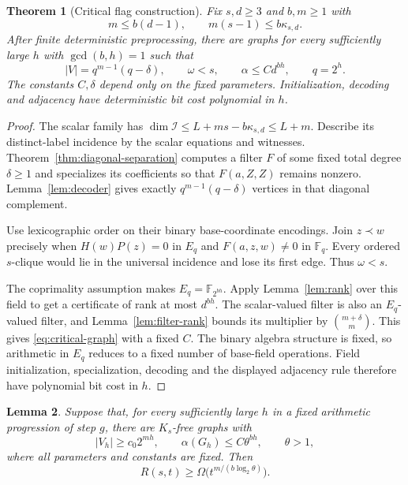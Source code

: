 \documentclass[11pt,a4paper]{article}
\newcommand{\F}{\mathbb F}
\newcommand{\Ical}{\mathcal I}
\newtheorem{theorem}{Theorem}[section]
\newtheorem{lemma}[theorem]{Lemma}
\theoremstyle{definition}
\theoremstyle{remark}
\numberwithin{equation}{section}
\begin{document}
\begin{theorem}[Critical flag construction]\label{thm:critical}
Fix $s,d\ge3$ and $b,m\ge1$ with
\begin{equation}\label{eq:endpoint-condition}
m\le b(d-1),\qquad m(s-1)\le b\kappa_{s,d}.
\end{equation}
After finite deterministic preprocessing, there are graphs for every sufficiently large $h$ with $\gcd(b,h)=1$ such that
\begin{equation}\label{eq:critical-graph}
|V|=q^{m-1}(q-\delta),\qquad\omega<s,\qquad\alpha\le C d^{bh},\qquad q=2^h.
\end{equation}
The constants $C,\delta$ depend only on the fixed parameters. Initialization, decoding and adjacency have deterministic bit cost polynomial in $h$.
\end{theorem}


\begin{proof}
The scalar family has $\dim\Ical\le L+ms-b\kappa_{s,d}\le L+m$. Describe its distinct-label incidence by the scalar equations and witnesses. Theorem~\ref{thm:diagonal-separation} computes a filter $F$ of some fixed total degree $\delta\ge1$ and specializes its coefficients so that $F(a,Z,Z)$ remains nonzero. Lemma~\ref{lem:decoder} gives exactly $q^{m-1}(q-\delta)$ vertices in that diagonal complement.

Use lexicographic order on their binary base-coordinate encodings. Join $z\prec w$ precisely when $H(w)P(z)=0$ in $E_q$ and $F(a,z,w)\ne0$ in $\F_q$. Every ordered $s$-clique would lie in the universal incidence and lose its first edge. Thus $\omega<s$.

The coprimality assumption makes $E_q=\F_{2^{bh}}$. Apply Lemma~\ref{lem:rank} over this field to get a certificate of rank at most $d^{bh}$. The scalar-valued filter is also an $E_q$-valued filter, and Lemma~\ref{lem:filter-rank} bounds its multiplier by $\binom{m+\delta}{m}$. This gives \eqref{eq:critical-graph} with a fixed $C$. The binary algebra structure is fixed, so arithmetic in $E_q$ reduces to a fixed number of base-field operations. Field initialization, specialization, decoding and the displayed adjacency rule therefore have polynomial bit cost in $h$.
\end{proof}


\begin{lemma}\label{lem:extraction}
Suppose that, for every sufficiently large $h$ in a fixed arithmetic progression of step $g$, there are $K_s$-free graphs with
\[
|V_h|\ge c_0 2^{mh},\qquad\alpha(G_h)\le C\theta^{bh},\qquad\theta>1,
\]
where all parameters and constants are fixed. Then
\begin{equation}\label{eq:bounded-gap-extraction}
R(s,t)\ge\Omega\bigl(t^{m/(b\log_2\theta)}\bigr).
\end{equation}
\end{lemma}
\end{document}

